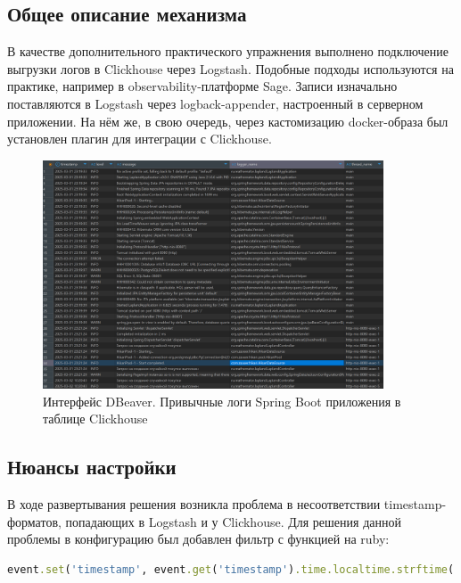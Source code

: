 \subsection{Общее описание механизма}\label{subsec:clickhousecommon}
В качестве дополнительного практического упражнения выполнено подключение выгрузки логов в Clickhouse через
Logstash.
Подобные подходы используются на практике, например в observability-платформе Sage.
Записи изначально поставляются в Logstash через logback-appender, настроенный в серверном приложении.
На нём же, в свою очередь, через кастомизацию docker-образа был установлен плагин для интеграции с Clickhouse.

\begin{figure}[htbp]
    \centering
    \includegraphics[width=0.9\textwidth]{clickhouse} %
    \caption{Интерфейс DBeaver. Привычные логи Spring Boot приложения в таблице Clickhouse}\label{fig:clickhouse}
\end{figure}

\subsection{Нюансы настройки}\label{subsec:clickhousedetails}
В ходе развертывания решения возникла проблема в несоответствии timestamp-форматов, попадающих в Logstash и у
Clickhouse.
Для решения данной проблемы в конфигурацию был добавлен фильтр с функцией на ruby:
\begin{lstlisting}[language=ruby, frame=single, basicstyle=\normalsize\ttfamily, breaklines=true,label={lst:rubylist}]
event.set('timestamp', event.get('timestamp').time.localtime.strftime('%Y-%m-%d %H:%M:%S'))
\end{lstlisting}


